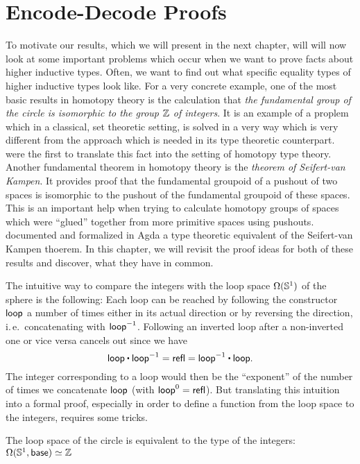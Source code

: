 \section{Encode-Decode Proofs}

To motivate our results, which we will present in the next chapter,
will will now look at some important problems which occur when
we want to prove facts about higher inductive types.
Often, we want to find out what specific equality types of
higher inductive types look like.
For a very concrete example, one of the most basic results in homotopy theory
is the calculation that \emph{the fundamental group of the circle is
isomorphic to the group $\mathbb Z$ of integers}.
It is an example of a proplem which in a classical, set theoretic setting,
is solved in a very way which is very different from the approach which is needed
in its type theoretic counterpart.
\cite{licataShulman_circle} were the first to translate this fact into the
setting of homotopy type theory.
Another fundamental theorem in homotopy theory is the \emph{theorem of
Seifert-van Kampen}.
It provides proof that the fundamental groupoid of a pushout of two spaces is
isomorphic to the pushout of the fundamental groupoid of these spaces.
This is an important help when trying to calculate homotopy groups of spaces
which were ``glued'' together from more primitive spaces using pushouts.
\cite{favonia:SvK} documented and formalized in Agda a type theoretic
equivalent of the Seifert-van Kampen thoerem.
In this chapter, we will revisit the proof ideas for both of these results
and discover, what they have in common.

The intuitive way to compare the integers with the loop space
$\Omega(\mathbb{S}^1)$ of the sphere is the following:
Each loop can be reached by following the constructor $\mathsf{loop}$ a number of
times either in its actual direction or by reversing the direction, i.\,e.\
concatenating with $\mathsf{loop} ^{-1}$.
Following an inverted loop after a non-inverted one or vice versa cancels out since
we have
\begin{equation*}
\Sloop \ct \Sloop \inv = \refl = \Sloop \inv \ct \Sloop \text{.}
\end{equation*}
The integer corresponding to a loop would then be the ``exponent'' of the number
of times we concatenate $\mathsf{loop}$ (with $\mathsf{loop}^0 = \mathsf{refl}$).
But translating this intuition into a formal proof, especially in order
to define a function from the loop space to the integers, requires some tricks.
\begin{thm}[Loop Space of the Circle, \cite{licataShulman_circle}]\label{thm:hit-s1}
The loop space of the circle is equivalent to the
type of the integers: $\Omega(\mathbb{S}^1, \mathsf{base}) \simeq \mathbb Z$
\end{thm}

